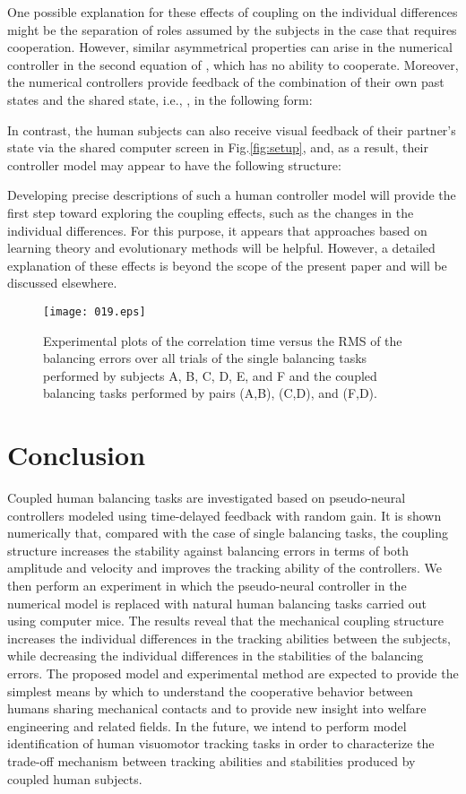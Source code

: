 \documentclass[12pt,a4paper]{ijicic}
\def\lfig#1{\label{fig:#1}}\def\rfig#1{Fig.\ref{fig:#1}}
\begin{document}
One possible explanation for these effects of coupling on the individual
differences might be the separation of roles assumed by the subjects in
the case that requires cooperation.  However, similar asymmetrical
properties can arise in the numerical controller  in the
second equation of , which has no ability to cooperate.
Moreover, the numerical controllers provide feedback of the combination
of their own past states and the shared state, i.e., ,
in the following form:

In contrast, the human subjects can also receive visual feedback of
their partner's state via the shared computer screen in \rfig{setup},
and, as a result, their controller model may appear to have the
following structure:

Developing precise descriptions of such a human controller model will
provide the first step toward exploring the coupling effects, such as
the changes in the individual differences.
 For this purpose, it appears that approaches based on learning theory
 and evolutionary methods\cite{Genci2009-1,Genci2009-2} will be helpful.
However, a detailed explanation of these effects is beyond the scope of
the present paper and will be discussed elsewhere.

\begin{figure}[t]
 \centering\par \texttt{[image: 019.eps]}\\
\caption{Experimental plots of the correlation time  versus the RMS
 of the balancing errors over all trials of the single balancing tasks
 performed by subjects A, B, C, D, E, and F and the coupled balancing tasks performed by 
 pairs (A,B), (C,D), and (F,D).}
\lfig{rmstau}
\end{figure}


\section{Conclusion}

Coupled human balancing tasks are investigated based on pseudo-neural
controllers modeled using time-delayed feedback with random gain.  It is
shown numerically that, compared with the case of single balancing
tasks, the coupling structure increases the stability against balancing
errors in terms of both amplitude and velocity and improves the tracking
ability of the controllers.  We then perform an experiment in which the
pseudo-neural controller in the numerical model is replaced with natural
human balancing tasks carried out using computer mice.
The results reveal that the mechanical coupling structure increases the
individual differences in the tracking abilities between the subjects,
while decreasing the individual differences in the stabilities of the
balancing errors.
The proposed model and experimental method are expected to provide the
simplest means by which to understand the cooperative behavior between
humans sharing mechanical contacts and to provide new insight into
welfare engineering and related fields.  In the future, we intend to
perform model identification of human visuomotor tracking tasks in order
to characterize the trade-off mechanism between tracking abilities and
stabilities produced by coupled human subjects.



\end{document}

